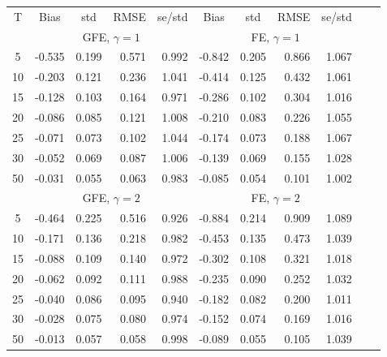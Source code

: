 \documentclass{article}
\begin{document}
 
\begin{tabular}{c r r r r r r r r r r} 
\toprule 
T & \multicolumn{1}{c}{ Bias } & \multicolumn{1}{c}{ std } & \multicolumn{1}{c}{ RMSE } & \multicolumn{1}{c}{ se/std } & \multicolumn{1}{c}{ Bias } & \multicolumn{1}{c}{ std } & \multicolumn{1}{c}{ RMSE } & \multicolumn{1}{c}{ se/std }\\[2pt]
 & \multicolumn{ 4 }{c}{ GFE, $\gamma=1$} & \multicolumn{ 4 }{c}{ FE, $\gamma=1$}\\[-3pt]
 \cmidrule(lr){2-5}  \cmidrule(lr){6-9}
5 &     -0.535 &      0.199 &      0.571 &      0.992 &     -0.842 &      0.205 &      0.866 &      1.067\\
10 &     -0.203 &      0.121 &      0.236 &      1.041 &     -0.414 &      0.125 &      0.432 &      1.061\\
15 &     -0.128 &      0.103 &      0.164 &      0.971 &     -0.286 &      0.102 &      0.304 &      1.016\\
20 &     -0.086 &      0.085 &      0.121 &      1.008 &     -0.210 &      0.083 &      0.226 &      1.055\\
25 &     -0.071 &      0.073 &      0.102 &      1.044 &     -0.174 &      0.073 &      0.188 &      1.067\\
30 &     -0.052 &      0.069 &      0.087 &      1.006 &     -0.139 &      0.069 &      0.155 &      1.028\\
50 &     -0.031 &      0.055 &      0.063 &      0.983 &     -0.085 &      0.054 &      0.101 &      1.002\\[0pt]
 & \multicolumn{ 4 }{c}{ GFE, $\gamma=2$} & \multicolumn{ 4 }{c}{ FE, $\gamma=2$}\\[-3pt]
 \cmidrule(lr){2-5}  \cmidrule(lr){6-9}
5 &     -0.464 &      0.225 &      0.516 &      0.926 &     -0.884 &      0.214 &      0.909 &      1.089\\
10 &     -0.171 &      0.136 &      0.218 &      0.982 &     -0.453 &      0.135 &      0.473 &      1.039\\
15 &     -0.088 &      0.109 &      0.140 &      0.972 &     -0.302 &      0.108 &      0.321 &      1.018\\
20 &     -0.062 &      0.092 &      0.111 &      0.988 &     -0.235 &      0.090 &      0.252 &      1.032\\
25 &     -0.040 &      0.086 &      0.095 &      0.940 &     -0.182 &      0.082 &      0.200 &      1.011\\
30 &     -0.028 &      0.075 &      0.080 &      0.974 &     -0.152 &      0.074 &      0.169 &      1.016\\
50 &     -0.013 &      0.057 &      0.058 &      0.998 &     -0.089 &      0.055 &      0.105 &      1.039\\[0pt]
\bottomrule 
\end{tabular}
\end{document}
